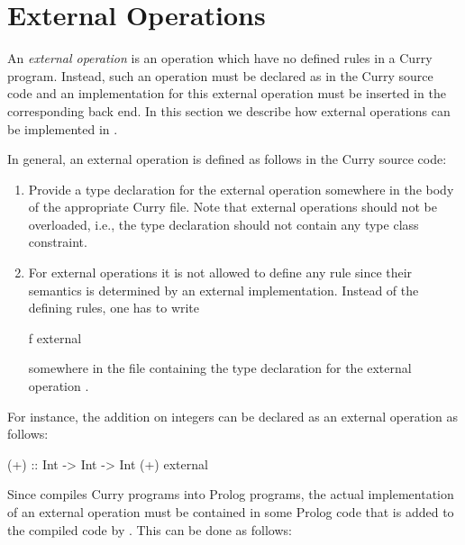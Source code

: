 \section{External Operations}
\label{sec-external-operations}

An \emph{external operation} is an operation which have no defined rules
in a Curry program.
Instead, such an operation must be declared as 
in the Curry source code
and an implementation for this external operation
must be inserted in the corresponding back end.
In this section we describe how external operations
can be implemented in \CYS.

In general, an external operation is defined as follows
in the Curry source code:
\begin{enumerate}
\item
Provide a type declaration for the external operation somewhere
in the body of the appropriate Curry file.
Note that external operations should not be overloaded,
i.e., the type declaration should not contain any type class constraint.
\item
For external operations it is not allowed to define any
rule since their semantics is determined by an external implementation.
Instead of the defining rules, one has to write
\begin{curry}
f external
\end{curry}
somewhere in the file containing the type declaration for 
the external operation .
\end{enumerate}
For instance, the addition on integers can be declared as
an external operation as follows:
\begin{curry}
(+) :: Int -> Int -> Int
(+) external
\end{curry}
Since \CYS compiles Curry programs into Prolog programs,
the actual implementation of an external operation
must be contained in some Prolog code that
is added to the compiled code by \CYS.
This can be done as follows:
%
